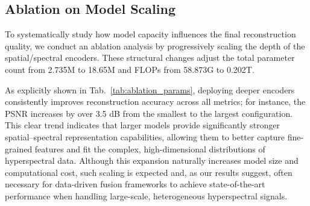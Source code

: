 \begin{table}[!t]
\centering
\setlength{\tabcolsep}{1pt}
\caption{Ablation on model scaling. 
$E_{spe}$ and $E_{spa}$ denote spatial and spectral encoder depths.}
\label{tab:ablation_params}
\end{table}

\subsection{Ablation on Model Scaling}
\label{modelscaling}
To systematically study how model capacity influences the final reconstruction quality, we conduct an ablation analysis by progressively scaling the depth of the spatial/spectral encoders. These structural changes adjust the total parameter count from 2.735M to 18.65M and FLOPs from 58.873G to 0.202T. 

As explicitly shown in Tab.~\ref{tab:ablation_params}, deploying deeper encoders consistently improves reconstruction accuracy across all metrics; for instance, the PSNR increases by over 3.5 dB from the smallest to the largest configuration. This clear trend indicates that larger models provide significantly stronger spatial–spectral representation capabilities, allowing them to better capture fine-grained features and fit the complex, high-dimensional distributions of hyperspectral data. Although this expansion naturally increases model size and computational cost, such scaling is expected and, as our results suggest, often necessary for data-driven fusion frameworks to achieve state-of-the-art performance when handling large-scale, heterogeneous hyperspectral signals.
